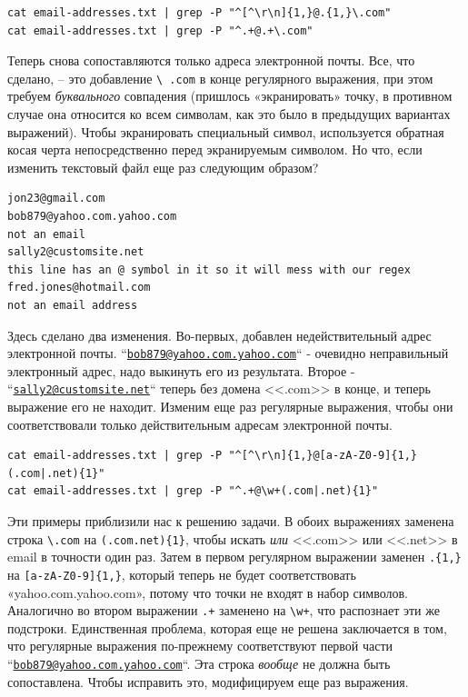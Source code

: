 \documentclass[12pt]{article}
\begin{document}
\begin{verbatim}
cat email-addresses.txt | grep -P "^[^\r\n]{1,}@.{1,}\.com"
cat email-addresses.txt | grep -P "^.+@.+\.com"
\end{verbatim}

Теперь снова сопоставляются только адреса электронной почты. Все, что
сделано, -- это добавление \texttt{\textbackslash{}\ .com} в конце
регулярного выражения, при этом требуем \emph{буквального}
совпадения (пришлось «экранировать» точку, в противном случае
она относится ко всем символам, как это было в предыдущих вариантах
выражений). Чтобы экранировать специальный символ, используется обратная
косая черта непосредственно перед экранируемым символом. Но что, если
изменить текстовый файл еще раз следующим образом?

\begin{verbatim}
jon23@gmail.com
bob879@yahoo.com.yahoo.com
not an email
sally2@customsite.net
this line has an @ symbol in it so it will mess with our regex
fred.jones@hotmail.com
not an email address
\end{verbatim}

Здесь сделано два изменения. Во-первых, добавлен недействительный адрес
электронной почты.
``\href{mailto:bob879@yahoo.com.yahoo.com}{\nolinkurl{bob879@yahoo.com.yahoo.com}}``
- очевидно неправильный электронный адрес, надо выкинуть его из
результата. Второе -
``\href{mailto:sally2@customsite.net}{\nolinkurl{sally2@customsite.net}}``
теперь без домена <<.com>> в конце, и теперь выражение его не находит.
Изменим еще раз регулярные выражения, чтобы они соответствовали только
действительным адресам электронной почты.

\begin{verbatim}
cat email-addresses.txt | grep -P "^[^\r\n]{1,}@[a-zA-Z0-9]{1,}(.com|.net){1}"
cat email-addresses.txt | grep -P "^.+@\w+(.com|.net){1}"
\end{verbatim}

Эти примеры приблизили нас к решению задачи. В обоих выражениях заменена
строка \texttt{\textbackslash{}.com} на
\texttt{(.com\textbar{}.net)\{1\}}, чтобы искать \emph{или} <<.com>> или
<<.net>> в email в точности один раз. Затем в первом регулярном
выражении заменен \texttt{.\{1,\}} на \texttt{{[}a-zA-Z0-9{]}\{1,\}},
который теперь не будет соответствовать «yahoo.com.yahoo.com», потому
что точки не входят в набор символов. Аналогично во втором выражении
\texttt{.+} заменено на \texttt{\textbackslash{}w+}, что распознает эти
же подстроки. Единственная проблема, которая еще не решена заключается в
том, что регулярные выражения по-прежнему соответствуют первой части
``\href{mailto:bob879@yahoo.com.yahoo.com}{\nolinkurl{bob879@yahoo.com.yahoo.com}}``.
Эта строка \emph{вообще} не должна быть сопоставлена. Чтобы исправить
это, модифицируем еще раз выражения.
\end{document}
